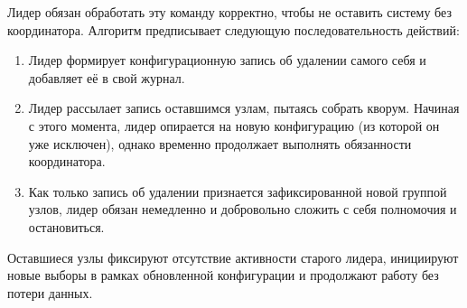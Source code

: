 Лидер обязан обработать эту команду корректно, чтобы не оставить систему без координатора. Алгоритм предписывает следующую последовательность действий:
\begin{enumerate}
    \item Лидер формирует конфигурационную запись об удалении самого себя и добавляет её в свой журнал.
    \item Лидер рассылает запись оставшимся узлам, пытаясь собрать кворум. Начиная с этого момента, лидер опирается на новую конфигурацию (из которой он уже исключен), однако временно продолжает выполнять обязанности координатора.
    \item Как только запись об удалении признается зафиксированной новой группой узлов, лидер обязан немедленно и добровольно сложить с себя полномочия и остановиться.
\end{enumerate}
Оставшиеся узлы фиксируют отсутствие активности старого лидера, инициируют новые выборы в рамках обновленной конфигурации и продолжают работу без потери данных.
